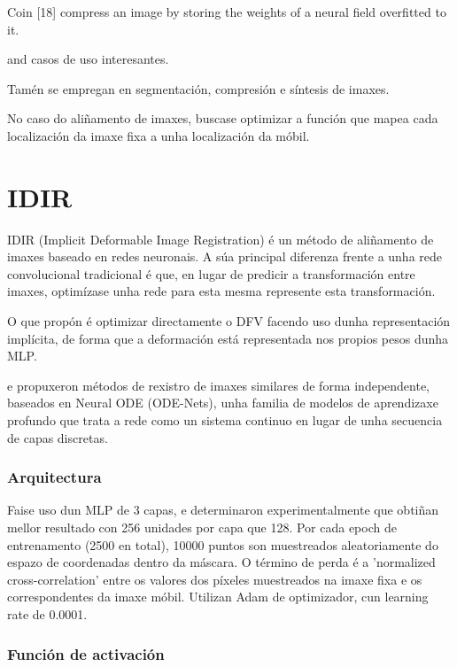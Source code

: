 Coin [18] compress an image by storing the
weights of a neural field overfitted to it.

\cite{velikova2024implicitneuralrepresentationsbreathingcompensated} and  casos de uso interesantes.

Tamén se empregan en segmentación, compresión e síntesis de imaxes.

 No caso do aliñamento de imaxes, buscase optimizar a función que mapea cada localización da imaxe fixa a unha localización da móbil.

\section{IDIR}
\label{sec:IDIR}
IDIR (Implicit Deformable Image Registration) é un método de aliñamento de imaxes baseado en redes neuronais. 
A súa principal diferenza frente a unha rede convolucional tradicional é que, 
en lugar de predicir a transformación entre imaxes, optimízase unha rede para esta mesma represente esta transformación.

O que \cite{wolterink2021implicit} propón é optimizar directamente o DFV facendo uso
 dunha representación implícita, de forma que a deformación está representada nos propios pesos dunha MLP.

 \cite{sun2024medicalimageregistrationneural} e \cite{nodeo} propuxeron métodos de rexistro de imaxes similares de forma independente,
 baseados en Neural ODE (ODE-Nets)\cite{neuralode}, unha familia de modelos de aprendizaxe profundo que trata a rede como un sistema continuo en lugar de unha secuencia de capas discretas.


\subsubsection{Arquitectura}
\label{subsubsec:Arquitectura}

Faise uso dun MLP de 3 capas, e determinaron experimentalmente que obtiñan mellor resultado con 256 unidades por capa que 128.
Por cada epoch de entrenamento (2500 en total), 10000 puntos son muestreados aleatoriamente do espazo de coordenadas dentro da máscara.
O término de perda é a 'normalized cross-correlation' entre os valores dos píxeles muestreados na imaxe fixa e os correspondentes da imaxe móbil.
Utilizan Adam de optimizador, cun learning rate de 0.0001.

\subsubsection{Función de activación}
\label{subsubsec:Función de activación}

